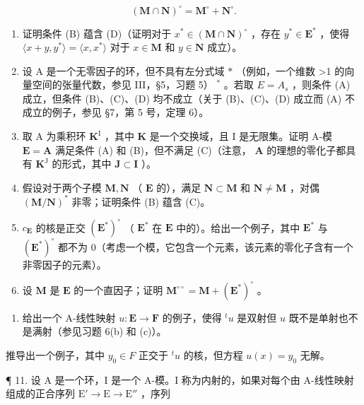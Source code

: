 \[
(\mathbf {M} \cap \mathbf {N}) ^ {\circ} = \mathbf {M} ^ {\circ} + \mathbf {N} ^ {\circ}.
\]

\begin{enumerate}
\def\labelenumi{(\alph{enumi})}
\item
  证明条件 (B) 蕴含 (D)（证明对于 \(x^{*} \in (\mathbf{M} \cap \mathbf{N})^{\circ}\) ，存在 \(y^{*} \in \mathbf{E}^{*}\) ，使得 \(\langle x + y, y^{*} \rangle = \langle x, x^{*} \rangle\) 对于 \(x \in \mathbf{M}\) 和 \(y \in \mathbf{N}\) 成立）。
\item
  设 A 是一个无零因子的环，但不具有左分式域 \(*\) （例如，一个维数 \textgreater1 的向量空间的张量代数，参见 III，§5，习题 5） \(^{*}\) 。若取 \(E = A_{s}\) ，则条件 (A) 成立，但条件 (B)、(C)、(D) 均不成立（关于 (B)、(C)、(D) 成立而 (A) 不成立的例子，参见 §7，第 5 号，定理 6）。
\item
  取 A 为乘积环 \(\mathbf{K}^{\mathrm{I}}\) ，其中 \(\mathbf{K}\) 是一个交换域，且 I 是无限集。证明 A-模 \(\mathbf{E} = \mathbf{A}\) 满足条件 (A) 和 (B)，但不满足 (C)（注意， \(\mathbf{A}\) 的理想的零化子都具有 \(\mathbf{K}^{\mathrm{J}}\) 的形式，其中 \(\mathbf{J} \subset \mathbf{I}\) ）。
\item
  假设对于两个子模 \(\mathbf{M},\mathbf{N}\) （ \(\mathbf{E}\) 的），满足 \(\mathbf{N} \subset \mathbf{M}\) 和 \(\mathbf{N} \neq \mathbf{M}\) ，对偶 \((\mathbf{M} / \mathbf{N})^*\) 非零；证明条件 (B) 蕴含 (C)。
\item
  \(c_{\mathbf{E}}\) 的核是正交 \((\mathbf{E}^{*})^{\circ}\) （ \(\mathbf{E}^{*}\) 在 \(\mathbf{E}\) 中的）。给出一个例子，其中 \(\mathbf{E}^{*}\) 与 \((\mathbf{E}^{*})^{\circ}\) 都不为 0（考虑一个模，它包含一个元素，该元素的零化子含有一个非零因子的元素）。
\item
  设 \(\mathbf{M}\) 是 \(\mathbf{E}\) 的一个直因子；证明 \(\mathbf{M}^{\circ \circ} = \mathbf{M} + (\mathbf{E}^{*})^{\circ}\) 。
\end{enumerate}

\begin{enumerate}
\def\labelenumi{\arabic{enumi}.}
\setcounter{enumi}{9}
\tightlist
\item
  给出一个 A-线性映射 \(u: \mathbf{E} \to \mathbf{F}\) 的例子，使得 \(^t u\) 是双射但 \(u\) 既不是单射也不是满射（参见习题 6(b) 和 (c)）。
\end{enumerate}

推导出一个例子，其中 \(y_{0} \in F\) 正交于 \(^{t}u\) 的核，但方程 \(u(x) = y_{0}\) 无解。

¶ 11. 设 A 是一个环，I 是一个 A-模。I 称为内射的，如果对每个由 A-线性映射组成的正合序列 \(\mathrm{E}' \to \mathrm{E} \to \mathrm{E}''\) ，序列

